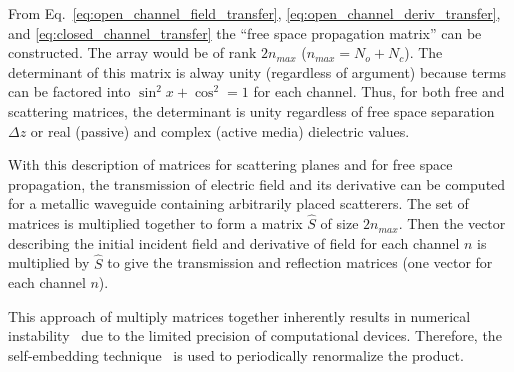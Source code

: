 From Eq.~\ref{eq:open_channel_field_transfer}, \ref{eq:open_channel_deriv_transfer}, and \ref{eq:closed_channel_transfer} the ``free space propagation matrix'' can be constructed. The array would be of rank $2 n_{max}$ ($n_{max}=N_o+N_c$). The determinant of this matrix is alway unity (regardless of argument) because terms can be factored into $\sin^2x +\cos^2=1$ for each channel. Thus, for both free and scattering matrices, the determinant is unity regardless of free space separation $\Delta z$ or real (passive) and complex (active media) dielectric values.

With this description of matrices for scattering planes and for free space propagation, the transmission of electric field and its derivative can be computed for a metallic waveguide containing arbitrarily placed scatterers. The set of matrices is multiplied together to form a matrix $\hat{S}$ of size $2n_{max}$. Then the vector describing the initial incident field and derivative of field for each channel $n$ is multiplied by $\hat{S}$ to give the transmission and reflection matrices (one vector for each channel $n$).

This approach of multiply matrices together inherently results in numerical instability~\cite{1968_Osedelec} due to the limited precision of computational devices. Therefore, the self-embedding technique~\cite{1999_yamilov_selfembed,1976_Bellman_Wing_embedding} is used to periodically renormalize the product.

